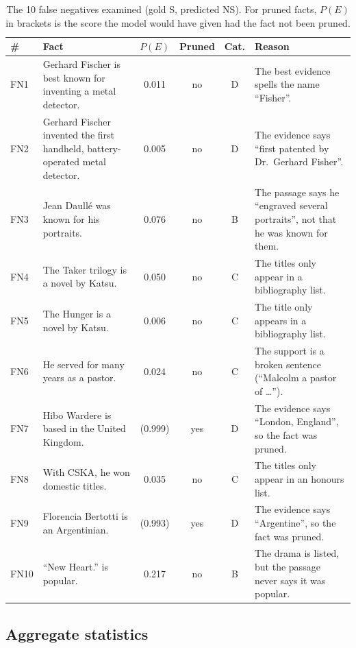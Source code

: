 \documentclass[12pt,a4paper]{article}
\begin{document}
\begin{table}[H]
\centering
\small
\begin{tabularx}{\linewidth}{l L{4.6cm} c c c Y}
\toprule
\# & Fact & $P(E)$ & Pruned & Cat. & Reason \\
\midrule
FN1 & Gerhard Fischer is best known for inventing a metal detector. & 0.011 & no & D & The best evidence spells the name ``Fisher''. \\
FN2 & Gerhard Fischer invented the first handheld, battery-operated metal detector. & 0.005 & no & D & The evidence says ``first patented by Dr.\ Gerhard Fisher''. \\
FN3 & Jean Daullé was known for his portraits. & 0.076 & no & B & The passage says he ``engraved several portraits'', not that he was known for them. \\
FN4 & The Taker trilogy is a novel by Katsu. & 0.050 & no & C & The titles only appear in a bibliography list. \\
FN5 & The Hunger is a novel by Katsu. & 0.006 & no & C & The title only appears in a bibliography list. \\
FN6 & He served for many years as a pastor. & 0.024 & no & C & The support is a broken sentence (``Malcolm a pastor of \dots''). \\
FN7 & Hibo Wardere is based in the United Kingdom. & (0.999) & yes & D & The evidence says ``London, England'', so the fact was pruned. \\
FN8 & With CSKA, he won domestic titles. & 0.035 & no & C & The titles only appear in an honours list. \\
FN9 & Florencia Bertotti is an Argentinian. & (0.993) & yes & D & The evidence says ``Argentine'', so the fact was pruned. \\
FN10 & ``New Heart.'' is popular. & 0.217 & no & B & The drama is listed, but the passage never says it was popular. \\
\bottomrule
\end{tabularx}
\caption{The 10 false negatives examined (gold S, predicted NS). For pruned facts, $P(E)$ in brackets is the score the model would have given had the fact not been pruned.}
\label{tab:fns}
\end{table}

\subsection{Aggregate statistics}
\label{sec:stats}
\end{document}
